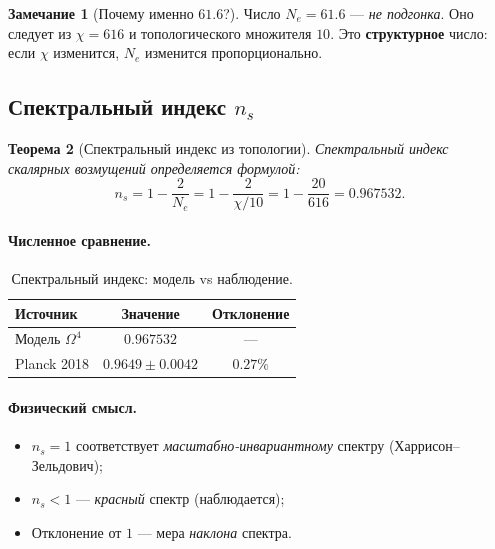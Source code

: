 \documentclass[11pt,a4paper]{article}
\newcommand{\Om}{\Omega^4}
\newtheorem{theorem}{Теорема}[section]
\theoremstyle{definition}
\newtheorem{remark}[theorem]{Замечание}
\begin{document}
\begin{remark}[Почему именно $61.6$?]
\label{rem:why-61-6}
Число $N_e = 61.6$ — \emph{не подгонка}. Оно следует из 
$\chi = 616$ и топологического множителя $10$. Это 
\textbf{структурное} число: если $\chi$ изменится, 
$N_e$ изменится пропорционально.
\end{remark}

\subsection{Спектральный индекс $n_s$}
\label{subsec:ns}

\begin{theorem}[Спектральный индекс из топологии]
\label{thm:ns}
Спектральный индекс скалярных возмущений определяется формулой:
\begin{equation}
    \boxed{
    n_s = 1 - \frac{2}{N_e} = 1 - \frac{2}{\chi/10}
    = 1 - \frac{20}{616} = 0.967532.
    }
    \label{eq:ns-main}
\end{equation}
\end{theorem}

\paragraph{Численное сравнение.}
\begin{table}[htbp]
\centering
\caption{Спектральный индекс: модель vs наблюдение.}
\label{tab:ns-comparison}
\begin{tabular}{lcc}
\toprule
Источник & Значение & Отклонение \\ 
\midrule
Модель $\Om$ & $0.967532$ & --- \\[0.3em]
Planck 2018 & $0.9649 \pm 0.0042$ & $0.27\%$ \\ 
\bottomrule
\end{tabular}
\end{table}

\paragraph{Физический смысл.}
\begin{itemize}
    \item $n_s = 1$ соответствует \emph{масштабно-инвариантному} 
          спектру (Харрисон--Зельдович);
    \item $n_s < 1$ — \emph{красный} спектр (наблюдается);
    \item Отклонение от $1$ — мера \emph{наклона} спектра.
\end{itemize}
\end{document}
